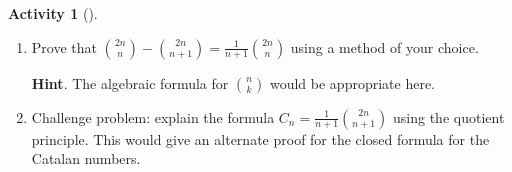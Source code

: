 \documentclass[10pt,]{book}
\theoremstyle{plain}
\theoremstyle{definition}
\theoremstyle{definition}
\theoremstyle{definition}
\newtheorem{activity}[project]{Activity}
\numberwithin{equation}{chapter}
\begin{document}
\begin{activity}[]\label{activity-176}
\leavevmode%
\begin{enumerate}[font=\bfseries,label=(\alph*),ref=\alph*]
\item\label{task-195} \hypertarget{p-1038}{}%
Prove that \(\binom{2n}{n} - \binom{2n}{n+1} = \frac{1}{n+1}\binom{2n}{n}\) using a method of your choice.%
\par\smallskip%
\noindent\textbf{Hint}.\hypertarget{hint-124}{}\quad%
\hypertarget{p-1039}{}%
The algebraic formula for \(\binom{n}{k}\) would be appropriate here.%
\item\label{task-196} \hypertarget{p-1040}{}%
Challenge problem: explain the formula \(C_n = \frac{1}{n+1}\binom{2n}{n+1}\) using the quotient principle.  This would give an alternate proof for the closed formula for the Catalan numbers.%
\end{enumerate}
\end{activity}
\typeout{************************************************}
\typeout{************************************************}
\end{document}
